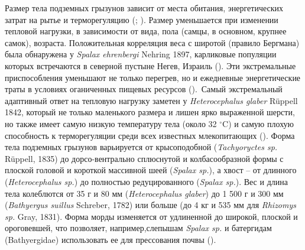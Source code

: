


Размер тела подземных грызунов зависит от места обитания, энергетических затрат на рытье и терморегуляцию (\cite{Vleck1979}; \cite{McNab1979}). Размер уменьшается при изменении тепловой нагрузки, в зависимости от вида, пола (самцы, в основном, крупнее самок), возраста. Положительная корреляция веса с широтой (правило Бергмана) была обнаружена у \textit{Spalax ehrenbergi} Nehring 1897, карликовые популяции которых встречаются в северной пустыне Негев, Израиль (\cite{McNab1966}). Эти экстремальные приспособления уменьшают не только перегрев, но и ежедневные энергетические траты в условиях оганиченных пищевых ресурсов (\cite{McNab1980}). Самый экстремальный адаптивный ответ на тепловую нагрузку заметен у \textit{Heterocephalus glaber} Rüppell 1842, который не только маленького размера и лишен ярко выраженной шерсти, но также имеет самую низкую температуру тела (около 32 $^\circ$C) и самую плохую способность к терморегуляции среди всех известных млекопитающих (\cite{McNab1966}). Форма тела подземных грызунов варьируется от крысоподобной (\textit{Tachyoryctes sp.} Rüppell, 1835) до дорсо-вентрально сплюснутой и колбасообразной формы с плоской головой и короткой массивной шеей (\textit{Spalax sp.}), а хвост -- от длинного (\textit{Heterocephalus sp.}) до полностью редуцированного (\textit{Spalax sp.}). Вес и длина тела колеблются от 35 г и 80 мм (\textit{Heterocephalus glaber}) до 1 500 г и 300 мм (\textit{Bathyergus suillus} Schreber, 1782) или больше (до 4 кг и 535 мм для \textit{Rhizomys sp.} Gray, 1831). Форма морды изменяется от удлиненной до широкой, плоской и ороговевшей, что позволяет, например,слепышам \textit{Spalax sp.} и батергидам (Bathyergidae) использовать ее для прессования почвы (\cite{Lacey2000}). 

